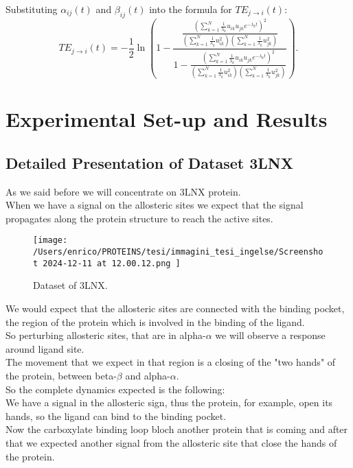 \documentclass[English, Lau, oneside]{sapthesis}
\begin{document}
Substituting \(\alpha_{ij}(t)\) and \(\beta_{ij}(t)\) into the formula for \(TE_{j \to i}(t)\):
\[
TE_{j \to i}(t) = -\frac{1}{2} \ln{\left(1 - \frac{\frac{\left(\sum_{k=1}^N \frac{1}{\lambda_k} u_{ik} u_{jk} e^{-\lambda_k t}\right)^2}
{\left(\sum_{k=1}^N \frac{1}{\lambda_k} u_{ik}^2\right)\left(\sum_{k=1}^N \frac{1}{\lambda_k} u_{jk}^2\right)}}
{1 - \frac{\left(\sum_{k=1}^N \frac{1}{\lambda_k} u_{ik} u_{jk} e^{-\lambda_k t}\right)^2}
{\left(\sum_{k=1}^N \frac{1}{\lambda_k} u_{ik}^2\right)\left(\sum_{k=1}^N \frac{1}{\lambda_k} u_{jk}^2\right)}}\right)}.
\]







\chapter{Experimental Set-up and Results}
\section{Detailed Presentation of Dataset 3LNX}
\noindent As we said before we will concentrate on 3LNX protein. \\
When we have a signal on the allosteric sites we expect that the signal propagates along the protein structure to reach the active sites.\\
\begin{figure}[h!]
    \centering
    \texttt{[image: /Users/enrico/PROTEINS/tesi/immagini\_tesi\_ingelse/Screenshot 2024-12-11 at 12.00.12.png
    ]}
    \caption{Dataset of 3LNX.}
\end{figure}
We would expect that the allosteric sites are connected with the binding pocket, the region of the protein which is involved in the binding of the ligand.\\
So perturbing allosteric sites, that are in alpha-$\alpha$ we will observe a response around ligand site.\\ 
The movement that we expect in that region is a closing of the "two hands" of the protein, between beta-$\beta$ and alpha-$\alpha$.\\
So the complete dynamics expected is the following:\\
We have a signal in the allosteric sign, thus the protein, for example, open its hands, so the ligand can bind to the binding pocket.\\
Now the carboxylate binding loop bloch another protein that is coming and after that we expected another signal from the allosteric site that close the hands of the protein.\\
\end{document}

